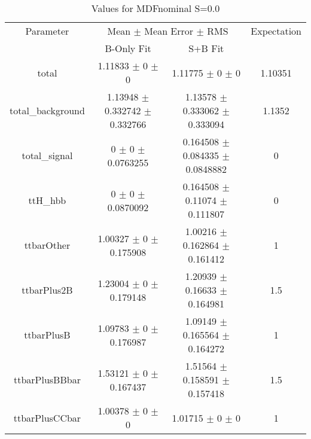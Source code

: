 \begin{table}
\centering
\caption{Values for MDFnominal S=0.0}
\begin{tabular}{cccc}
\toprule
Parameter & \multicolumn{2}{c}{Mean $\pm$ Mean Error $\pm$ RMS} & Expectation\\
 & B-Only Fit & S+B Fit & \\
\midrule
total & \num{1.11833} $\pm$ \num{0} $\pm$ \num{0} & \num{1.11775} $\pm$ \num{0} $\pm$ \num{0} & \num{1.10351}\\
total\_background & \num{1.13948} $\pm$ \num{0.332742} $\pm$ \num{0.332766} & \num{1.13578} $\pm$ \num{0.333062} $\pm$ \num{0.333094} & \num{1.1352}\\
total\_signal & \num{0} $\pm$ \num{0} $\pm$ \num{0.0763255} & \num{0.164508} $\pm$ \num{0.084335} $\pm$ \num{0.0848882} & \num{0}\\
ttH\_hbb & \num{0} $\pm$ \num{0} $\pm$ \num{0.0870092} & \num{0.164508} $\pm$ \num{0.11074} $\pm$ \num{0.111807} & \num{0}\\
ttbarOther & \num{1.00327} $\pm$ \num{0} $\pm$ \num{0.175908} & \num{1.00216} $\pm$ \num{0.162864} $\pm$ \num{0.161412} & \num{1}\\
ttbarPlus2B & \num{1.23004} $\pm$ \num{0} $\pm$ \num{0.179148} & \num{1.20939} $\pm$ \num{0.16633} $\pm$ \num{0.164981} & \num{1.5}\\
ttbarPlusB & \num{1.09783} $\pm$ \num{0} $\pm$ \num{0.176987} & \num{1.09149} $\pm$ \num{0.165564} $\pm$ \num{0.164272} & \num{1}\\
ttbarPlusBBbar & \num{1.53121} $\pm$ \num{0} $\pm$ \num{0.167437} & \num{1.51564} $\pm$ \num{0.158591} $\pm$ \num{0.157418} & \num{1.5}\\
ttbarPlusCCbar & \num{1.00378} $\pm$ \num{0} $\pm$ \num{0} & \num{1.01715} $\pm$ \num{0} $\pm$ \num{0} & \num{1}\\
\bottomrule
\end{tabular}
\end{table}